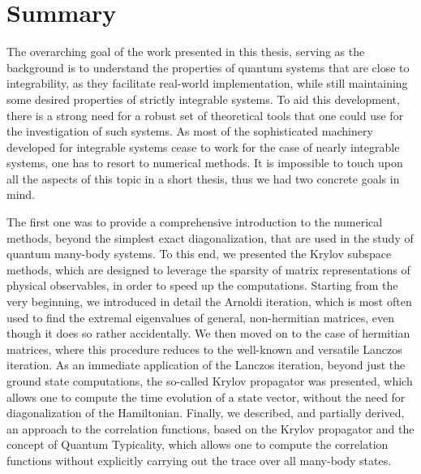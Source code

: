 \chapter{Summary}
\thispagestyle{chapterBeginStyle}


The overarching goal of the work presented in this thesis, serving as the background is to understand the properties of
quantum systems that are close to integrability, as they facilitate real-world implementation, while
still maintaining some desired properties of strictly integrable systems.
To aid this development, there is a strong need for a robust set of theoretical tools that one
could use for the investigation of such systems. As most of the sophisticated machinery developed
for integrable systems cease to work for the case of nearly integrable systems, one has
to resort to numerical methods. It is impossible to touch upon all the aspects of this
topic in a short thesis, thus we had two concrete goals in mind.

The first one was to provide a comprehensive introduction to the numerical methods, beyond the simplest exact
diagonalization, that are used in the study of quantum many-body systems. To this end, we presented
the Krylov subspace methods, which are designed to leverage the sparsity of matrix representations of
physical observables, in order to speed up the computations. Starting from the very beginning, we 
introduced in detail the Arnoldi iteration, which is most often used to find the extremal eigenvalues
of general, non-hermitian matrices, even though it does so rather accidentally. We then moved on to
the case of hermitian matrices, where this procedure reduces to the well-known and versatile
Lanczos iteration. As an immediate application of the Lanczos iteration, beyond just the ground state
computations, the so-called Krylov propagator was presented, which allows one to compute the time evolution of
a state vector, without the need for diagonalization of the Hamiltonian. Finally, we described,
and partially derived, an approach to the correlation functions, based on the Krylov
propagator and the concept of Quantum Typicality, which allows one to compute the correlation functions
without explicitly carrying out the trace over all many-body states.

